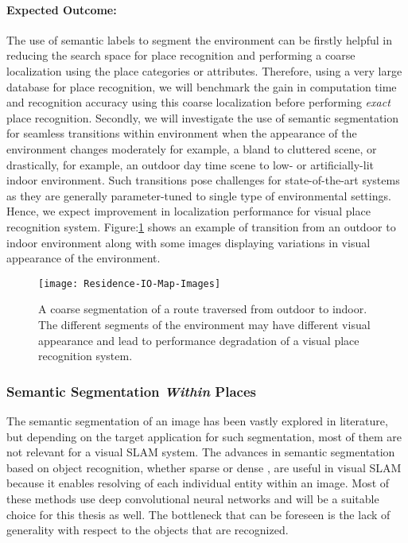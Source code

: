 \documentclass{article}
\begin{document}
\paragraph{Expected Outcome:}
The use of semantic labels to segment the environment can be firstly helpful in reducing the search space for place recognition and performing a coarse localization using the place categories or attributes. Therefore, using a very large database for place recognition, we will benchmark the gain in computation time and recognition accuracy using this coarse localization before performing \emph{exact} place recognition. Secondly, we will investigate the use of semantic segmentation for seamless transitions within environment when the appearance of the environment changes moderately for example, a bland to cluttered scene, or drastically, for example, an outdoor day time scene to low- or artificially-lit indoor environment. Such transitions pose challenges for state-of-the-art systems as they are generally parameter-tuned to single type of environmental settings. Hence, we expect improvement in localization performance for visual place recognition system. Figure:\ref{fig:semantic-across-example} shows an example of transition from an outdoor to indoor environment along with some images displaying variations in visual appearance of the environment.

\begin{figure}[htbp]
 \centering
 \texttt{[image: Residence-IO-Map-Images]}
 \caption{A coarse segmentation of a route traversed from outdoor to indoor. The different segments of the environment may have different visual appearance and lead to performance degradation of a visual place recognition system.}
 \label{fig:semantic-across-example}
\end{figure}

\subsubsection{Semantic Segmentation \emph{Within} Places}
The semantic segmentation of an image has been vastly explored in literature, but depending on the target application for such segmentation, most of them are not relevant for a visual SLAM system. The advances in semantic segmentation based on object recognition, whether sparse \cite{girshick2014rich} or dense \cite{long2015fully}, are useful in visual SLAM because it enables resolving of each individual entity within an image. Most of these methods use deep convolutional neural networks and will be a suitable choice for this thesis as well. The bottleneck that can be foreseen is the lack of generality with respect to the objects that are recognized. 
\end{document}
